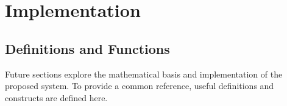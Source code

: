 \section{Implementation}
\label{sec:implementation}

\subsection{Definitions and Functions}

Future sections explore the mathematical basis and implementation of the proposed system. To provide a common reference, useful definitions and constructs are defined here.

\newcommand{\viewpoint}{\ensuremath{v}}
\newcommand{\viewpointdomain}{\ensuremath{V}}
\newcommand{\dmin}{\ensuremath{d_{\text{min}}}}
\newcommand{\dmax}{\ensuremath{d_{\text{max}}}}
\newcommand{\observation}{\ensuremath{o}}
\newcommand{\observations}[1]{\ensuremath{\boldsymbol{O}^{#1}}}
\newcommand{\pe}{\ensuremath{P(E)}}
\newcommand{\estpe}{\ensuremath{\hat{P}(E)}}
\newcommand{\ps}{\ensuremath{P(S,v)}}
\newcommand{\psge}{\ensuremath{P(S,v|E)}}
\newcommand{\estpsge}{\ensuremath{\hat{P}(S,v|E)}}
\newcommand{\psgne}{\ensuremath{P(S,v|\lnot E)}}
\newcommand{\pegs}{\ensuremath{P(E|S,v)}}
\newcommand{\pegns}{\ensuremath{P(E|\lnot S,v)}}
\newcommand{\falsepos}{\ensuremath{\varepsilon_{\text{pos}}}}
\newcommand{\falseneg}{\ensuremath{\varepsilon_{\text{neg}}}}
\newcommand{\damping}{\ensuremath{\alpha}}
\newcommand{\observability}{\ensuremath{\rho}}
\newcommand{\observabilityupdate}{\ensuremath{\eta}}
\newcommand{\state}{\ensuremath{s}}
\newcommand{\feedback}{\ensuremath{\beta}}
\newcommand{\params}[1]{\ensuremath{\boldsymbol{\theta}_{#1}}}
\newcommand{\param}[2]{\ensuremath{\theta_{#1,#2}}}
\newcommand{\epe}{\ensuremath{\text{EPE}}}
\newcommand{\vbee}{\ensuremath{\text{VBEE}}}
\newcommand{\knn}{\ensuremath{\text{KNN}}}
\newcommand{\db}{\ensuremath{\text{DB}}}
\newcommand{\initialize}[1]{\ensuremath{\operatorname{Initialize}(#1)}}
\newcommand{\estimate}[1]{\ensuremath{\operatorname{Estimate}(#1)}}
\newcommand{\integrate}[1]{\ensuremath{\operatorname{Integrate}(#1)}}
\newcommand{\update}[1]{\ensuremath{\operatorname{Update}(#1)}}
\newcommand{\query}{\ensuremath{\operatorname{Query}()}}
\newcommand{\athreshold}{\ensuremath{\tau_{\text{angle}}}}
\newcommand{\feedbackthreshold}{\ensuremath{\tau_{\beta}}}
\newcommand{\existsthreshold}{\ensuremath{\tau_{E}}}

